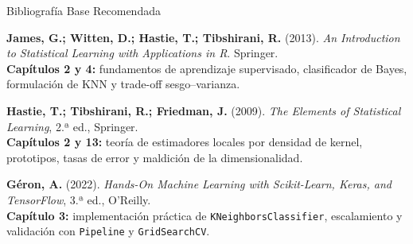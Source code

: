 \begin{frame}{Bibliografía Base Recomendada}
\footnotesize
\begin{ccdebox}
\textbf{James, G.; Witten, D.; Hastie, T.; Tibshirani, R.} (2013). \emph{An Introduction to Statistical Learning with Applications in R}. Springer.\\
\textbf{Capítulos 2 y 4:} fundamentos de aprendizaje supervisado, clasificador de Bayes, formulación de KNN y trade-off sesgo--varianza.
\end{ccdebox}
\vspace{0.06cm}
\begin{ccdebox}
\textbf{Hastie, T.; Tibshirani, R.; Friedman, J.} (2009). \emph{The Elements of Statistical Learning}, 2.ª ed., Springer.\\
\textbf{Capítulos 2 y 13:} teoría de estimadores locales por densidad de kernel, prototipos, tasas de error y maldición de la dimensionalidad.
\end{ccdebox}
\vspace{0.06cm}
\begin{ccdebox}
\textbf{Géron, A.} (2022). \emph{Hands-On Machine Learning with Scikit-Learn, Keras, and TensorFlow}, 3.ª ed., O'Reilly.\\
\textbf{Capítulo 3:} implementación práctica de \texttt{KNeighborsClassifier}, escalamiento y validación con \texttt{Pipeline} y \texttt{GridSearchCV}.
\end{ccdebox}
\end{frame}
